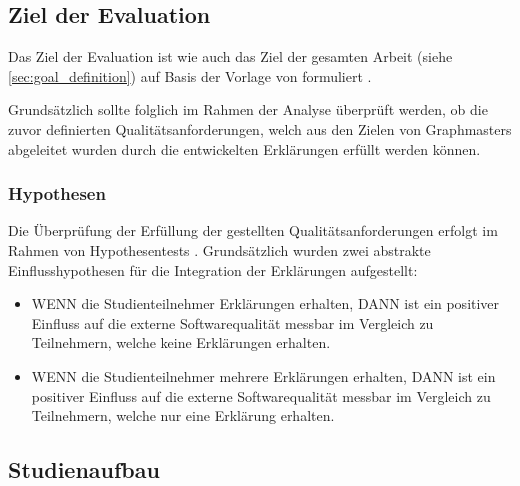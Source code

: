 \subsection{Ziel der Evaluation}

Das Ziel der Evaluation ist wie auch das Ziel der gesamten Arbeit (siehe \autoref{sec:goal_definition}) auf Basis der Vorlage von \citeauthor{wohlin2012experimentation} formuliert \cite{wohlin2012experimentation}.

\smallskip

\noindent{}

\smallskip

Grundsätzlich sollte folglich im Rahmen der Analyse überprüft werden, ob die zuvor definierten Qualitätsanforderungen, welch aus den Zielen von Graphmasters abgeleitet wurden durch die entwickelten Erklärungen erfüllt werden können.

\subsubsection{Hypothesen}
\label{sec:evaluation_hypothesis}

Die Überprüfung der Erfüllung der gestellten Qualitätsanforderungen erfolgt im Rahmen von Hypothesentests \cite{wohlin2012experimentation}. Grundsätzlich wurden zwei abstrakte Einflusshypothesen für die Integration der Erklärungen aufgestellt:

\begin{itemize}
    \item WENN die Studienteilnehmer Erklärungen erhalten, DANN ist ein positiver Einfluss auf die externe Softwarequalität messbar im Vergleich zu Teilnehmern, welche keine Erklärungen erhalten.
    \item WENN die Studienteilnehmer mehrere Erklärungen erhalten, DANN ist ein positiver Einfluss auf die externe Softwarequalität messbar im Vergleich zu Teilnehmern, welche nur eine Erklärung erhalten.
\end{itemize}

\subsection{Studienaufbau}

